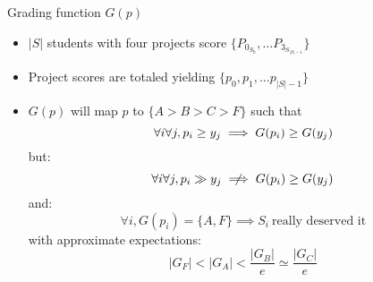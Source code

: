 \documentclass[pdf]{beamer}
\begin{document}
\begin{frame}{Grading function $G(p)$}
\begin{itemize}
\item $|S|$ students with four projects score $\{P_{0_{S_0}}, \dotsc P_{3_{S_{|S| - 1}}}\}$
\item Project scores are totaled yielding $\{p_0, p_1, \dotsc p_{|S| - 1}\}$
\item $G(p)$ will map $p$ to $\{A > B > C > F\}$ such that
\begin{equation}
\forall i \forall j,  p_i\ge y_j \implies G(p_i)\ge G(y_j) \nonumber \linebreak
\end{equation}
but:
\begin{equation}
\forall i \forall j,  p_i\gg y_j \centernot\implies G(p_i)\ge G(y_j) \nonumber
\end{equation}
and:
\begin{equation}
\forall i,  G(p_i) = \{A, F\} \implies S_i\ \text{really deserved it}\nonumber
\end{equation}
with approximate expectations:
\begin{equation}
|G_F| < |G_A| < \frac{|G_B|}{e} \simeq \frac{|G_C|}{e} \nonumber
\end{equation}
\end{itemize}
\end{frame}
\end{document}
